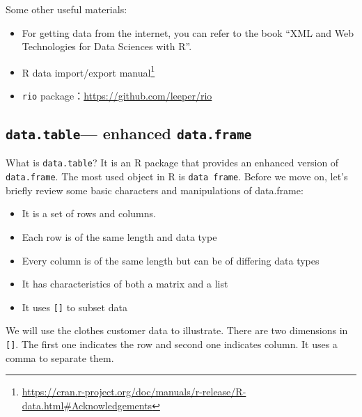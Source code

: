 \documentclass[12pt,]{krantz}
\providecommand{\tightlist}{%
  \setlength{\itemsep}{0pt}\setlength{\parskip}{0pt}}
\renewcommand{\href}[2]{#2\footnote{\url{#1}}}
\theoremstyle{definition}
\theoremstyle{definition}
\theoremstyle{definition}
\theoremstyle{remark}
\begin{document}
Some other useful materials:

\begin{itemize}
\tightlist
\item
  For getting data from the internet, you can refer to the book ``XML
  and Web Technologies for Data Sciences with R''.\\
\item
  \href{https://cran.r-project.org/doc/manuals/r-release/R-data.html\#Acknowledgements}{R
  data import/export manual}
\item
  \texttt{rio} package：\url{https://github.com/leeper/rio}
\end{itemize}

\subsection{\texorpdfstring{\texttt{data.table}--- enhanced
\texttt{data.frame}}{data.table--- enhanced data.frame}}\label{data.table-enhanced-data.frame}

What is \texttt{data.table}? It is an R package that provides an
enhanced version of \texttt{data.frame}. The most used object in R is
\texttt{data\ frame}. Before we move on, let's briefly review some basic
characters and manipulations of data.frame:

\begin{itemize}
\tightlist
\item
  It is a set of rows and columns.
\item
  Each row is of the same length and data type
\item
  Every column is of the same length but can be of differing data types
\item
  It has characteristics of both a matrix and a list
\item
  It uses \texttt{{[}{]}} to subset data
\end{itemize}

We will use the clothes customer data to illustrate. There are two
dimensions in \texttt{{[}{]}}. The first one indicates the row and
second one indicates column. It uses a comma to separate them.
\end{document}

